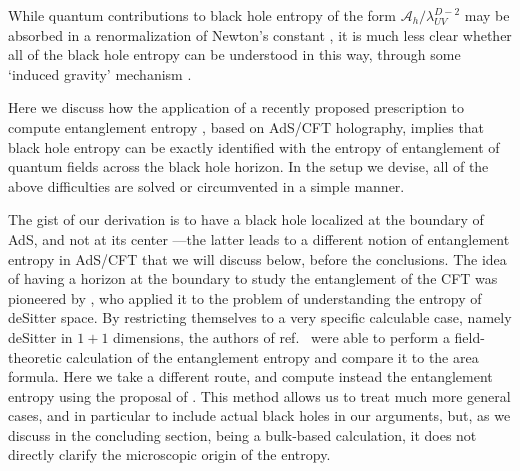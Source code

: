 \documentclass[12pt]{article}
\begin{document}
While quantum contributions to black hole entropy of the form
$\mathcal{A}_h/\lambda_{UV}^{D-2}$ may be absorbed in a renormalization
of Newton's constant \cite{sussug}, it is much less clear whether all of
the black hole entropy can be understood in this way, through some
`induced gravity' mechanism \cite{jac,ff}.

Here we discuss how the application of a recently proposed prescription to
compute entanglement entropy \cite{ryta}, based on
AdS/CFT holography, implies that black hole entropy can be exactly
identified with the entropy of entanglement of quantum fields across the
black hole horizon. In the setup we devise, all of the above
difficulties are solved or circumvented in a simple manner.

The gist of our derivation is to have a black hole localized at the
boundary of AdS, and not at its center ---the latter leads to a
different notion of entanglement entropy in AdS/CFT \cite{malda,brus}
that we will discuss below, before the conclusions. The idea of having a
horizon at the boundary to study the entanglement of the CFT was
pioneered by \cite{hms}, who applied it to the problem of understanding
the entropy of deSitter space. By restricting themselves to a very
specific calculable case, namely deSitter in $1+1$ dimensions, the
authors of ref.~\cite{hms} were able to perform a field-theoretic
calculation of the entanglement entropy and compare it to the area
formula. Here we take a different route, and compute instead the
entanglement entropy using the proposal of \cite{ryta}. This method
allows us to treat much more general cases, and in particular to include
actual black holes in our arguments, but, as we discuss in the
concluding section, being a bulk-based calculation, it does not directly
clarify the microscopic origin of the entropy.
\end{document}
